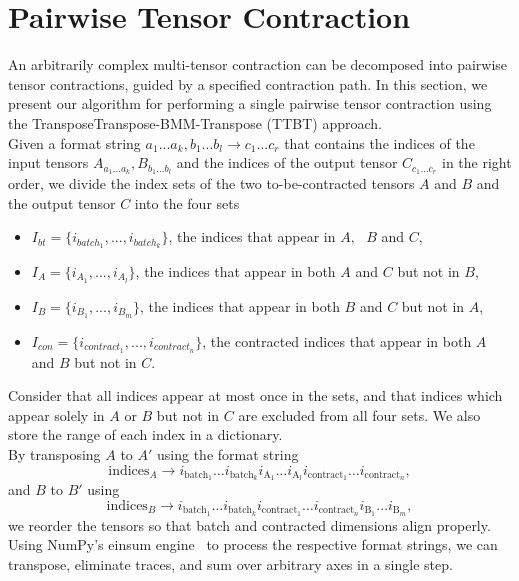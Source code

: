 \section{Pairwise Tensor Contraction}
An arbitrarily complex multi-tensor contraction can be decomposed into pairwise tensor contractions, guided by a specified
contraction path. In this section, we present our algorithm for performing a single pairwise tensor contraction using the TransposeTranspose-BMM-Transpose (TTBT) approach.\\

\noindent Given a format string $a_1...a_k,b_1...b_l\rightarrow c_1...c_r$ that contains the indices of the input tensors $A_{a_1...a_k},B_{b_1...b_l}$ and the indices of the output tensor $C_{c_1...c_r}$ in the right order, we divide the index sets of the two to-be-contracted tensors $A$ and $B$ and the output tensor $C$ into the four sets
\begin{itemize}
    \item $I_{bt}= \{i_{{batch}_1},...,i_{{batch}_k}\}$, the indices that appear in $A, \text{ }B$ and $C$,
    \item $I_A=\{i_{{A}_1}, ...,i_{{A}_l}\}$, the indices that appear in both $A$ and $C$ but not in $B$,
    \item $I_B= \{i_{B_1} ,...,i_{B_m}\}$, the indices that appear in both $B$ and $C$ but not in $A$,
    \item $I_{con} = \{ i_{{contract}_1}, ..., i_{{contract}_n}\}$, the contracted indices that appear in both $A$ and $B$ but not in $C$.
\end{itemize}
Consider that all indices appear at most once in the sets, and that indices which appear solely in $A$ or $B$ but not in $C$ are excluded from all four sets. We also store the range of each index in a dictionary.\\
By transposing $A$ to $A'$ using the format string  
$$\text{indices}_A \rightarrow i_{\text{batch}_1} \dots i_{\text{batch}_k} i_{\text{A}_1} \dots i_{\text{A}_l} i_{\text{contract}_1} \dots i_{\text{contract}_n},$$
and $B$ to $B'$ using  
$$\text{indices}_B \rightarrow i_{\text{batch}_1} \dots i_{\text{batch}_k} i_{\text{contract}_1} \dots i_{\text{contract}_n} i_{\text{B}_1} \dots i_{\text{B}_m},$$
\noindent we reorder the tensors so that batch and contracted dimensions align properly. Using NumPy’s einsum engine~\cite{Numpy} to process the respective format strings, we can transpose, eliminate traces, and sum over arbitrary axes in a single step.  \\
